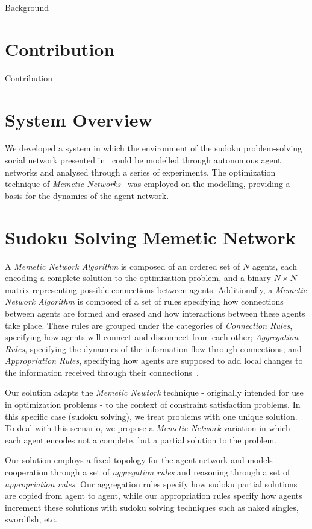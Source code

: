 \documentclass{article}
\begin{document}
Background

\section{Contribution}

Contribution

\section{System Overview}

We developed a system in which the environment of the sudoku problem-solving social network presented in~\cite{farenzena:collabem} could be modelled through autonomous agent networks and analysed through a series of experiments. The optimization technique of {\em Memetic Networks}~\cite{lamb:memenet} was employed on the modelling, providing a basis for the dynamics of the agent network.

\section{Sudoku Solving Memetic Network}
 
A {\em Memetic Network Algorithm} is composed of an ordered set of $N$ agents, each encoding a complete solution to the optimization problem, and a binary $N \times N$ matrix representing possible connections between agents. Additionally, a {\em Memetic Network Algorithm} is composed of a set of rules specifying how connections between agents are formed and erased and how interactions between these agents take place. These rules are grouped under the categories of {\em Connection Rules}, specifying how agents will connect and disconnect from each other; {\em Aggregation Rules}, specifying the dynamics of the information flow through connections; and {\em Appropriation Rules}, specifying how agents are supposed to add local changes to the information received through their connections~\cite{lamb:memenet}.

Our solution adapts the {\em Memetic Newtork} technique - originally intended for use in optimization problems - to the context of constraint satisfaction problems. In this specific case (sudoku solving), we treat problems with one unique solution. To deal with this scenario, we propose a {\em Memetic Network} variation in which each agent encodes not a complete, but a partial solution to the problem.

Our solution employs a fixed topology for the agent network and models cooperation through a set of {\em aggregation rules} and reasoning through a set of {\em appropriation rules}. Our aggregation rules specify how sudoku partial solutions are copied from agent to agent, while our appropriation rules specify how agents increment these solutions with sudoku solving techniques such as naked singles, swordfish, etc.
\end{document}
